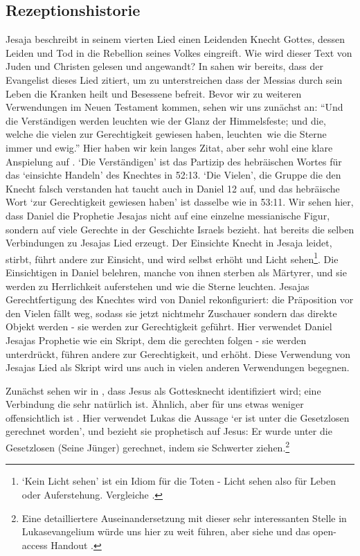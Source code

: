 \subsection{Rezeptionshistorie}
Jesaja beschreibt in seinem vierten Lied einen Leidenden Knecht Gottes, dessen Leiden und Tod
in die Rebellion seines Volkes eingreift. Wie wird dieser Text von Juden und Christen gelesen und angewandt?
In  sahen wir bereits, dass der Evangelist dieses Lied zitiert, um zu unterstreichen dass der Messias
durch sein Leben die Kranken heilt und Besessene befreit.
Bevor wir zu weiteren Verwendungen im Neuen Testament kommen, sehen wir uns zunächst  an:
``Und die Verständigen werden leuchten wie der Glanz der Himmelsfeste; und die, welche die vielen zur Gerechtigkeit gewiesen haben, \textlangle leuchten\textrangle\ wie die Sterne immer und ewig.''
Hier haben wir kein langes Zitat, aber sehr wohl eine klare Anspielung auf .
`Die Verständigen' ist das Partizip des hebräischen Wortes für das `einsichte Handeln' des Knechtes in 52:13.
`Die Vielen', die Gruppe die den Knecht falsch verstanden hat taucht auch in Daniel 12 auf, und das hebräische Wort `zur Gerechtigkeit gewiesen haben' ist dasselbe wie in 53:11.
Wir sehen hier, dass Daniel die Prophetie Jesajas nicht auf eine einzelne messianische Figur, sondern auf viele Gerechte in der Geschichte Israels bezieht.
 hat bereits die selben Verbindungen zu Jesajas Lied erzeugt.
Der Einsichte Knecht in Jesaja leidet, stirbt, führt andere zur Einsicht, und wird selbst erhöht und Licht sehen\footnote{
	`Kein Licht sehen' ist ein Idiom für die Toten - Licht sehen also für Leben oder Auferstehung. Vergleiche .
}.
Die Einsichtigen in Daniel belehren, manche von ihnen sterben als Märtyrer, und sie werden zu Herrlichkeit auferstehen und wie die Sterne leuchten.
Jesajas Gerechtfertigung des Knechtes wird von Daniel rekonfiguriert: die Präposition vor den Vielen fällt weg, sodass sie jetzt nichtmehr Zuschauer
sondern das direkte Objekt werden - sie werden zur Gerechtigkeit geführt.
Hier verwendet Daniel Jesajas Prophetie wie ein Skript, dem die gerechten folgen - sie werden unterdrückt, führen andere zur Gerechtigkeit, und erhöht.
Diese Verwendung von Jesajas Lied als Skript wird uns auch in vielen anderen Verwendungen begegnen.

Zunächst sehen wir in , dass Jesus als Gottesknecht identifiziert wird; eine Verbindung die sehr natürlich ist.
Ähnlich, aber für uns etwas weniger offensichtlich ist .
Hier verwendet Lukas die Aussage `er ist unter die Gesetzlosen gerechnet worden', und bezieht sie prophetisch auf Jesus:
Er wurde unter die Gesetzlosen (Seine Jünger) gerechnet, indem sie Schwerter ziehen.\footnote{
	Eine detailliertere Auseinandersetzung mit dieser sehr interessanten Stelle in Lukasevangelium würde uns hier zu weit führen, aber siehe \Cite{lukes-two-swords} und das open-access Handout \Cite{lukes-two-swords-handout}.
}

